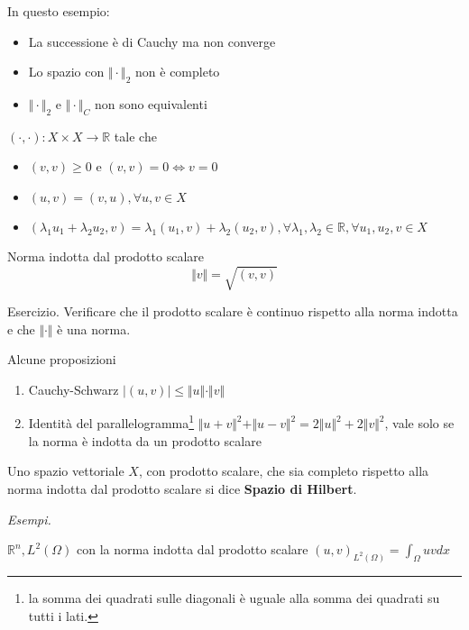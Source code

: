 \documentclass[10pt,a4paper,twoside,openright]{book}
\begin{document}
In questo esempio:
\begin{itemize}
\item La successione è di Cauchy ma non converge
\item Lo spazio con $\Vert \cdotp \Vert _{2}$ non è completo
\item $\Vert \cdotp \Vert _{2}$ e $\Vert \cdotp \Vert _{C}$ non sono equivalenti
\end{itemize}
\begin{definition}
 $(\cdotp,\cdotp) :X\times X\rightarrow \mathbb{R}$ tale che
\begin{itemize}
\item $(v,v) \geqslant 0$ e $(v,v) =0\Leftrightarrow v=0$
\item $(u,v) =(v,u),\forall u,v\in X$
\item $( \lambda _{1} u_{1} +\lambda _{2} u_{2},v) =\lambda _{1}(u_{1},v) +\lambda _{2}(u_{2},v),\forall \lambda _{1},\lambda _{2} \in \mathbb{R},\forall u_{1},u_{2},v\in X$
\end{itemize}
\end{definition}
\begin{definition}
Norma indotta dal prodotto scalare
\begin{equation*}
\Vert v\Vert =\sqrt{(v,v)}
\end{equation*}
\end{definition}
Esercizio. Verificare che il prodotto scalare è continuo rispetto alla norma indotta e che $\Vert \cdotp \Vert $ è una norma.
\begin{theorem}
Alcune proposizioni
\begin{enumerate}
\item Cauchy-Schwarz $| (u,v)| \leqslant \Vert u\Vert \cdotp \Vert v\Vert $
\item Identità del parallelogramma\footnote{la somma dei quadrati sulle diagonali è uguale alla somma dei quadrati su tutti i lati.} $\Vert u+v\Vert ^{2} +\Vert u-v\Vert ^{2} =2\Vert u\Vert ^{2} +2\Vert v\Vert ^{2}$, vale solo se la norma è indotta da un prodotto scalare
\end{enumerate}
\end{theorem}
\begin{definition}
Uno spazio vettoriale $X$, con prodotto scalare, che sia completo rispetto alla norma indotta dal prodotto scalare si dice \textbf{Spazio di Hilbert}.
\end{definition}
\textit{Esempi.}

$\mathbb{R}^{n},L^{2}(\Omega)$ con la norma indotta dal prodotto scalare $(u,v)_{L^{2}(\Omega)} =\int _{\Omega } uvdx$
\end{document}
